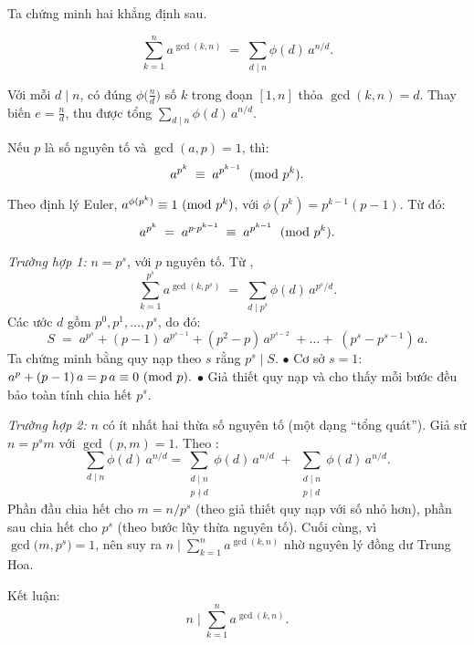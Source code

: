 \documentclass[../03-arithmetic-functions.tex]{subfiles}
\begin{document}
\begin{soln}
    Ta chứng minh hai khẳng định sau.

    \begin{theorem*}
        \[
            \sum_{k=1}^n a^{\gcd(k,n)} \;=\; \sum_{d \mid n} \phi(d)\, a^{n/d}.
        \]
    \end{theorem*}

    \begin{subproof}
        Với mỗi \( d \mid n \), có đúng \(\phi\bigl(\tfrac{n}{d}\bigr)\) số \( k\) trong đoạn \([1,n]\) thỏa \(\gcd(k,n)=d\). Thay biến \( e = \tfrac{n}{d}\), thu được tổng \(\sum_{d\mid n}\phi(d)\,a^{n/d}\).
    \end{subproof}

    \begin{theorem*}
        Nếu \( p \) là số nguyên tố và \( \gcd(a,p)=1 \), thì:
        \[
            a^{p^k} \;\equiv\; a^{p^{k-1}} \;\ (\mathrm{mod}\ p^k).
        \]
    \end{theorem*}

    \begin{subproof}
        Theo định lý Euler, \( a^{\phi(p^k)} \equiv 1 \ (\mathrm{mod}\ p^k)\), với \(\phi(p^k)=p^{k-1}(p-1)\). Từ đó:
        \[
            a^{p^k} \;=\; a^{p\cdot p^{k-1}} \;\equiv\; a^{p^{k-1}} \;\ (\mathrm{mod}\ p^k).
        \]
    \end{subproof}

    \textit{Trường hợp 1:} \( n = p^s \), với \(p\) nguyên tố.  
    Từ ,
    \[
        \sum_{k=1}^{p^s} a^{\gcd(k,p^s)}
        \;=\;
        \sum_{d \mid p^s} \phi(d)\, a^{p^s/d}.
    \]
    Các ước \(d\) gồm \(p^0, p^1, \dots, p^s\), do đó:
    \[
        S \;=\; a^{p^s} + (p-1)\,a^{p^{s-1}} + (p^2-p)\,a^{p^{s-2}}
        \;+\dots+\; (p^s - p^{s-1})\,a.
    \]
    Ta chứng minh bằng quy nạp theo \(s\) rằng \(p^s \mid S\).  
    \(\bullet\) Cơ sở \(s=1\): \(a^p + (p-1)\,a = p\,a \equiv 0\ (\mathrm{mod}\ p).\)  
    \(\bullet\) Giả thiết quy nạp và  cho thấy mỗi bước đều bảo toàn tính chia hết \(p^s\).  

    \textit{Trường hợp 2:} \(n\) có ít nhất hai thừa số nguyên tố (một dạng “tổng quát”).  
    Giả sử \( n = p^s m\) với \(\gcd(p,m)=1\). Theo :
    \[
        \sum_{d \mid n} \phi(d)\, a^{n/d} 
        = 
        \sum_{\substack{d \mid n \\ p \nmid d}} \phi(d)\, a^{n/d} 
        \;+\;
        \sum_{\substack{d \mid n \\ p \mid d}} \phi(d)\, a^{n/d}.
    \]
    Phần đầu chia hết cho \(m = n/p^s\) (theo giả thiết quy nạp với số nhỏ hơn), phần sau chia hết cho \(p^s\) (theo bước lũy thừa nguyên tố). Cuối cùng, vì \(\gcd\bigl(m,p^s\bigr)=1\), nên suy ra \(n\mid\sum_{k=1}^n a^{\gcd(k,n)}\) nhờ nguyên lý đồng dư Trung Hoa.

    Kết luận: 
    \[
        n \;\Big|\; \sum_{k=1}^{n} a^{\gcd(k,n)}.
    \]
\end{soln}

\end{document}
